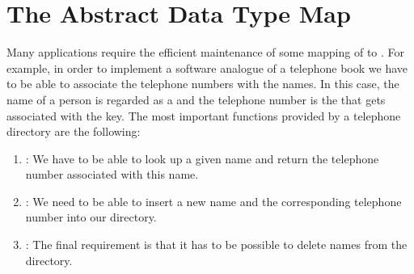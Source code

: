\section{The Abstract Data Type Map} 
Many applications require the efficient maintenance of some mapping of  to
.  For example, in order to implement a software analogue of a telephone book we have to
be able to associate the telephone numbers with the names.  In this case, the name of a person is regarded as a
 and the telephone number is the  that gets associated with the key.
The most important functions provided by a telephone directory are the following:
\begin{enumerate}
\item {}: We have to be able to look up a given name and return the telephone number
      associated with this name.
\item {}: We need to be able to insert a new name and the corresponding telephone
      number into our directory.
\item {}: The final requirement is that it has to be possible to delete names from
      the directory.
\end{enumerate}



